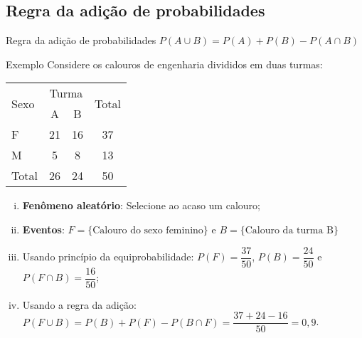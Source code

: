 \documentclass[9pt]{beamer}
\begin{document}
\subsection{Regra da adição de probabilidades}
\begin{frame}{}
\begin{block}{Regra da adição de probabilidades}
	$P(A \cup B) = P(A) + P(B) - P(A \cap B) $
\end{block}
\begin{block}{Exemplo}
	Considere os calouros de engenharia divididos em duas turmas:
	{\scriptsize
	\begin{table}[ht]
		\centering
		\begin{tabular}{l|cc|c}
			\toprule[0.05cm]
			\multirow{2}{*}{Sexo} & \multicolumn{2}{|c|}{Turma} & \multirow{2}{*}{Total} \\ \cmidrule{2-3}
			 & A & B &  \\ 
			\midrule[0.05cm]
			F & 21 & 16 & 37 \\ 
			M & 5 & 8 & 13 \\ \midrule[0.05cm] 
			Total & 26 & 24 & 50 \\ 
			\bottomrule[0.05cm]
		\end{tabular}
	\end{table}
	}


	\begin{enumerate}[i.]
		\item \textbf{Fenômeno aleatório}: Selecione ao acaso um calouro;
		\item \textbf{Eventos}: $F=\{\mbox{Calouro do sexo feminino}\}$ e $B=\{\mbox{Calouro da turma B}\}$
		\item Usando princípio da equiprobabilidade: $P(F)=\dfrac{37}{50}$, $P(B)=\dfrac{24}{50}$ e $P(F \cap B) = \dfrac{16}{50}$;
		\item Usando a regra da adição: $P(F \cup B) = P(B) + P(F)  - P(B \cap F) = \dfrac{37+24-16}{50}= 0,9$.
	\end{enumerate}
\end{block}
\end{frame}

\end{document}
